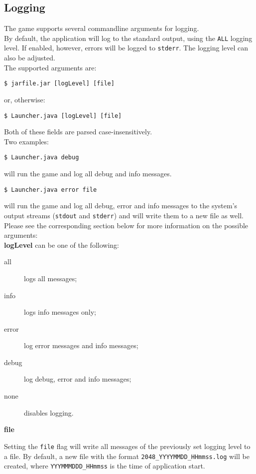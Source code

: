 \documentclass[a4paper,11pt,report]{scrartcl}
\begin{document}
\subsection{Logging}
The game supports several commandline arguments for logging.\\

By default, the application will log to the standard output, using the
\texttt{ALL} logging level. If enabled, however, errors will be logged to
\texttt{stderr}. The logging level can also be adjusted.\\

The supported arguments are:
\begin{verbatim}
$ jarfile.jar [logLevel] [file]
\end{verbatim}
or, otherwise:
\begin{verbatim}
$ Launcher.java [logLevel] [file]
\end{verbatim}
Both of these fields are parsed case-insensitively.\\

Two examples:
\begin{verbatim}
$ Launcher.java debug
\end{verbatim}
will run the game and log all debug and info messages. 
\begin{verbatim}
$ Launcher.java error file
\end{verbatim}
will run the game and log all debug, error and info messages to the system's
output streams (\texttt{stdout} and \texttt{stderr}) and will write them to a
new file as well.\\

Please see the corresponding section below for more information on the possible
arguments:\\

\textbf{logLevel} can be one of the following:
\begin{description}
	\item[all] logs all messages;
	\item[info] logs info messages only;
	\item[error] log error messages and info messages;
	\item[debug] log debug, error and info messages;
	\item[none] disables logging.
\end{description}

\textbf{file}

Setting the \texttt{file} flag will write all messages of the previously set
logging level to a file. By default, a new file with the format
\texttt{2048\_YYYYMMDD\_HHmmss.log} will be created, where
\texttt{YYYMMMDDD\_HHmmss} is the time of application start.
\end{document}

